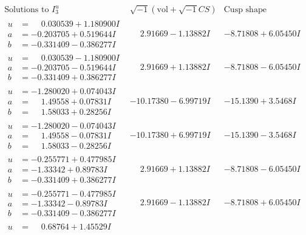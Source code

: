 \documentclass[1p]{elsarticle_modified}
\theoremstyle{definition}
\newcommand{\I}{\sqrt{-1}}
\begin{document}
$$\begin{array}{c|c|c}  
\text{Solutions to }I^u_{3}& \I (\text{vol} + \sqrt{-1}CS) & \text{Cusp shape}\\
 \hline 
\begin{aligned}
u &= \phantom{-}0.030539 + 1.180900 I \\
a &= -0.203705 + 0.519644 I \\
b &= -0.331409 - 0.386277 I\end{aligned}
 & \phantom{-}2.91669 - 1.13882 I & -8.71808 + 6.05450 I \\ \hline\begin{aligned}
u &= \phantom{-}0.030539 - 1.180900 I \\
a &= -0.203705 - 0.519644 I \\
b &= -0.331409 + 0.386277 I\end{aligned}
 & \phantom{-}2.91669 + 1.13882 I & -8.71808 - 6.05450 I \\ \hline\begin{aligned}
u &= -1.280020 + 0.074043 I \\
a &= \phantom{-}1.49558 + 0.07831 I \\
b &= \phantom{-}1.58033 + 0.28256 I\end{aligned}
 & -10.17380 - 6.99719 I & -15.1390 + 3.5468 I \\ \hline\begin{aligned}
u &= -1.280020 - 0.074043 I \\
a &= \phantom{-}1.49558 - 0.07831 I \\
b &= \phantom{-}1.58033 - 0.28256 I\end{aligned}
 & -10.17380 + 6.99719 I & -15.1390 - 3.5468 I \\ \hline\begin{aligned}
u &= -0.255771 + 0.477985 I \\
a &= -1.33342 + 0.89783 I \\
b &= -0.331409 + 0.386277 I\end{aligned}
 & \phantom{-}2.91669 + 1.13882 I & -8.71808 - 6.05450 I \\ \hline\begin{aligned}
u &= -0.255771 - 0.477985 I \\
a &= -1.33342 - 0.89783 I \\
b &= -0.331409 - 0.386277 I\end{aligned}
 & \phantom{-}2.91669 - 1.13882 I & -8.71808 + 6.05450 I \\ \hline\begin{aligned}
u &= \phantom{-}0.68764 + 1.45529 I \\

\end{aligned}
\end{array}$$
\end{document}

